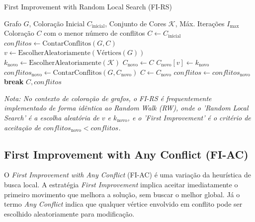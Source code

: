 \documentclass[12pt,a4paper]{article}
\begin{document}
\begin{algorithm}
\caption{First Improvement with Random Local Search (FI-RS)}
\label{alg:fi_rs}
\begin{algorithmic}[1]
\REQUIRE Grafo $G$, Coloração Inicial $C_{\text{inicial}}$, Conjunto de Cores $\mathcal{K}$, Máx. Iterações $I_{\max}$
\ENSURE Coloração $C$ com o menor número de conflitos
\STATE $C \gets C_{\text{inicial}}$
\STATE $conflitos \gets \text{ContarConflitos}(G, C)$
    \STATE $v \gets \text{EscolherAleatoriamente}(\text{Vértices}(G))$
    \STATE $k_{\text{novo}} \gets \text{EscolherAleatoriamente}(\mathcal{K})$
    \STATE $C_{\text{novo}} \gets C$
    \STATE $C_{\text{novo}}[v] \gets k_{\text{novo}}$
    \STATE $conflitos_{\text{novo}} \gets \text{ContarConflitos}(G, C_{\text{novo}})$
        \STATE $C \gets C_{\text{novo}}$
        \STATE $conflitos \gets conflitos_{\text{novo}}$
            \STATE \textbf{break}
        \ENDIF
    \ENDIF
\ENDFOR
\RETURN $C, conflitos$
\end{algorithmic}
\end{algorithm}
\textit{Nota: No contexto de coloração de grafos, o FI-RS é frequentemente implementado de forma idêntica ao Random Walk (RW), onde o 'Random Local Search' é a escolha aleatória de $v$ e $k_{\text{novo}}$, e o 'First Improvement' é o critério de aceitação de $conflitos_{\text{novo}} < conflitos$.}

\subsection{First Improvement with Any Conflict (FI-AC)}
O \textit{First Improvement with Any Conflict} (FI-AC) é uma variação da heurística de busca local. A estratégia \textit{First Improvement} implica aceitar imediatamente o primeiro movimento que melhora a solução, sem buscar o melhor global. Já o termo \textit{Any Conflict} indica que qualquer vértice envolvido em conflito pode ser escolhido aleatoriamente para modificação.
\end{document}
